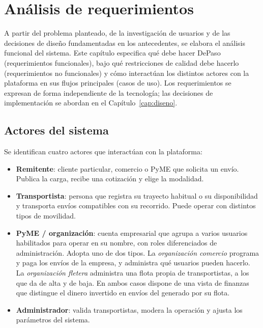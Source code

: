 {\color{nuevo}%
\chapter{Análisis de requerimientos}
\label{cap:requerimientos}

A partir del problema planteado, de la investigación de usuarios y de las decisiones de diseño fundamentadas en los antecedentes, se elabora el análisis funcional del sistema. Este capítulo especifica qué debe hacer DePaso (requerimientos funcionales), bajo qué restricciones de calidad debe hacerlo (requerimientos no funcionales) y cómo interactúan los distintos actores con la plataforma en sus flujos principales (casos de uso). Los requerimientos se expresan de forma independiente de la tecnología; las decisiones de implementación se abordan en el Capítulo~\ref{cap:diseno}.

\section{Actores del sistema}

Se identifican cuatro actores que interactúan con la plataforma:

\begin{itemize}[leftmargin=2em]
    \item \textbf{Remitente}: cliente particular, comercio o PyME que solicita un envío. Publica la carga, recibe una cotización y elige la modalidad.
    \item \textbf{Transportista}: persona que registra su trayecto habitual o su disponibilidad y transporta envíos compatibles con su recorrido. Puede operar con distintos tipos de movilidad.
    \item \textbf{PyME / organización}: cuenta empresarial que agrupa a varios usuarios habilitados para operar en su nombre, con roles diferenciados de administración. Adopta uno de dos tipos. La \emph{organización comercio} programa y paga los envíos de la empresa, y administra qué usuarios pueden hacerlo. La \emph{organización fletera} administra una flota propia de transportistas, a los que da de alta y de baja. En ambos casos dispone de una vista de finanzas que distingue el dinero invertido en envíos del generado por su flota.
    \item \textbf{Administrador}: valida transportistas, modera la operación y ajusta los parámetros del sistema.
\end{itemize}

}
